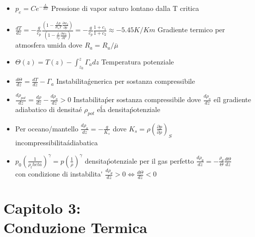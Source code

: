 \documentclass[a4paper]{article}
\begin{document}
\begin{itemize}
	\item $ p_e = C e^{- \frac{L}{RT}}$ Pressione di vapor saturo lontano dalla T critica
	\item $\frac{dT}{dz} = -\frac{g}{c_p} \frac{(1-\frac{Lp}{R_a T} \frac{\partial w_2}{\partial p})}{(1- \frac{L}{c_p} \frac{\partial w_2}{\partial T})} = -\frac{g}{c_p} \frac{1+c_1}{1+c_2} \approx -5.45K/Km$ Gradiente termico per atmosfera umida dove $R_a = R_u / \bar{\mu}$
	\item $\Theta (z)=T(z)-\int_{z_0}^{z}\Gamma_adz$ Temperatura potenziale
	\item $\frac{d \Theta}{dz}=\frac{dT}{dz}-\Gamma_a$ Instabilita\' generica per sostanza compressibile
	\item $\frac{d \rho_{pot}}{dz}=\frac{d \rho}{dz}-\frac{d \rho_a}{dz}>0 $ Instabilita\' per sostanza compressibile dove $\frac{d \rho_a}{dz}$ e\' il gradiente adiabatico di densita\' e $\rho_{pot}$ e\' la densita\' potenziale
	\item Per oceano/mantello $\frac{d \rho_a}{dz} = - \frac{g}{K_s}$ dove $K_s=\rho (\frac{\partial p}{\partial \rho})_S$ incompressibilita\' adiabatica
	\item $p_0(\frac{1}{\rho_theta})^\gamma=p(\frac{1}{\rho})^\gamma$ densita\' potenziale per il gas perfetto $\frac{d \rho_\theta}{dz}=-\frac{\rho_\theta}{\Theta} \frac{d \Theta}{dz}$ \\con condizione di instabilita\' $\frac{d \rho_\theta}{dz}>0 \iff \frac{d\Theta}{dz}<0$
	
\end{itemize}

\section{Capitolo 3:\\ Conduzione Termica}
\end{document}
